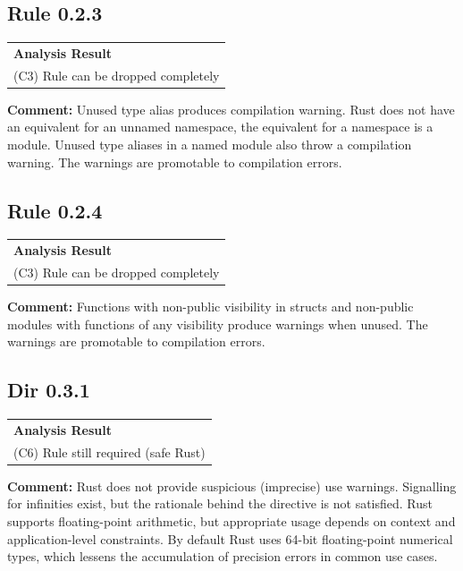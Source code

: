 \subsection*{Rule 0.2.3}
\begin{longtable}{p{13cm}}
\textbf{Analysis Result} \\
(C3) Rule can be dropped completely \\
\end{longtable}
\textbf{Comment:} Unused type alias produces compilation warning. Rust does not have an equivalent for an unnamed namespace, the equivalent for a namespace is a module. Unused type aliases in a named module also throw a compilation warning. The warnings are promotable to compilation errors. \\


\subsection*{Rule 0.2.4}
\begin{longtable}{p{13cm}}
\textbf{Analysis Result} \\
(C3) Rule can be dropped completely \\
\end{longtable}
\textbf{Comment:} Functions with non-public visibility in structs and non-public modules with functions of any visibility produce warnings when unused. The warnings are promotable to compilation errors. \\


\subsection*{Dir 0.3.1}
\begin{longtable}{p{13cm}}
\textbf{Analysis Result} \\
(C6) Rule still required (safe Rust) \\
\end{longtable}
\textbf{Comment:} Rust does not provide suspicious (imprecise) use warnings. Signalling for infinities exist, but the rationale behind the directive is not satisfied. Rust supports floating-point arithmetic, but appropriate usage depends on context and application-level constraints. By default Rust uses 64-bit floating-point numerical types, which lessens the accumulation of precision errors in common use cases. \\


